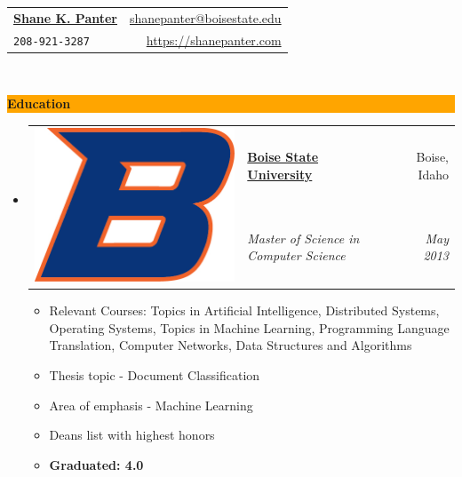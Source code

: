\documentclass[letterpaper,11pt]{article}
\makeatletter
\newcommand{\resitem}[1]{\item #1 \vspace{-2pt}}
\newcommand{\resheading}[1]{{\large
    \colorbox{Orange}{\begin{minipage}{\textwidth}{\textbf{#1
            \vphantom{p\^{E}}}}\end{minipage}}}}
\newcommand{\ressubheadingG}[5]{
\item[]
	\begin{tabular*}{6.5in}{l@{\hspace{.1in}} l@{\extracolsep{\fill}}r}
		\multirow{2}{1in}{#1} & \textbf{#2} & #3 \\
		& \textit{#4} & \textit{#5} \\
         \end{tabular*}
	 \vspace{-6pt}}
\newcommand{\mywebheader}{
  \begin{tabular*}{7in}{l@{\extracolsep{\fill}}r}
    \textbf{\href{https://shanepanter.com}{\LARGE Shane K. Panter}}
	  & \href{mailto:shanepanter@boisestate.edu}{shanepanter@boisestate.edu}\\
    {\footnotesize \texttt{208-921-3287}}
	  & \href{https://shanepanter.com} {https://shanepanter.com} \\
  \end{tabular*}
  \\
  \vspace{0.1in}}
\makeatother
\begin{document}
\mywebheader

\resheading{Education}
\begin{itemize}
  \ressubheadingG
	{\includegraphics[scale=.3]{bsu.jpg}}
	{\href{http://www.boisestate.edu}{Boise State University }}
	{Boise, Idaho }
	{Master of Science in Computer Science}
	{May 2013}
	{ \footnotesize
	    \begin{itemize}
	      \resitem{Relevant Courses: Topics in Artificial Intelligence, Distributed
		Systems, Operating Systems, Topics in Machine Learning,
		Programming Language Translation, Computer Networks, Data
		Structures and Algorithms}
	      \resitem{Thesis topic - Document Classification}
	      \resitem{Area of emphasis - Machine Learning}
	      \resitem{Deans list with highest honors}
	      \resitem{\textbf{Graduated: 4.0}}
	    \end{itemize}
	}


\end{itemize} %
\end{document}
